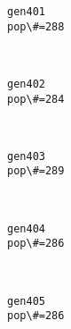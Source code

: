 \documentclass[11pt]{article}
\begin{document}
    \begin{Verbatim}[commandchars=\\\{\}]
gen401
pop\#=288

    \end{Verbatim}

    \begin{center}
    \end{center}
    { \hspace*{\fill} \\}
    
    \begin{Verbatim}[commandchars=\\\{\}]
gen402
pop\#=284

    \end{Verbatim}

    \begin{center}
    \end{center}
    { \hspace*{\fill} \\}
    
    \begin{Verbatim}[commandchars=\\\{\}]
gen403
pop\#=289

    \end{Verbatim}

    \begin{center}
    \end{center}
    { \hspace*{\fill} \\}
    
    \begin{Verbatim}[commandchars=\\\{\}]
gen404
pop\#=286

    \end{Verbatim}

    \begin{center}
    \end{center}
    { \hspace*{\fill} \\}
    
    \begin{Verbatim}[commandchars=\\\{\}]
gen405
pop\#=286

    \end{Verbatim}
\end{document}

